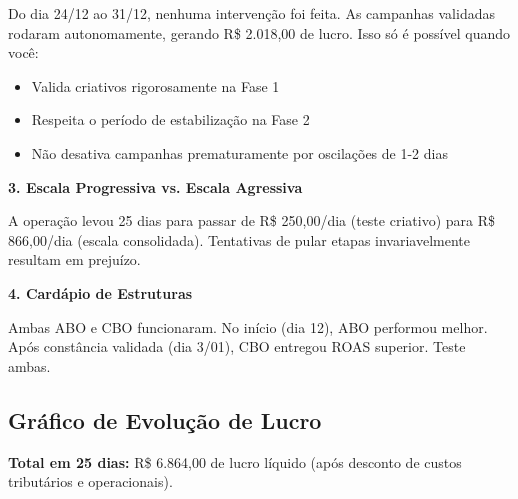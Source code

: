 \documentclass[12pt, a4paper]{article}
\newcommand{\reais}[1]{R\$ #1}
\begin{document}
Do dia 24/12 ao 31/12, nenhuma intervenção foi feita. As campanhas validadas rodaram autonomamente, gerando \reais{2.018,00} de lucro. Isso só é possível quando você:
\begin{itemize}
    \item Valida criativos rigorosamente na Fase 1
    \item Respeita o período de estabilização na Fase 2
    \item Não desativa campanhas prematuramente por oscilações de 1-2 dias
\end{itemize}

\pagebreak

\textbf{3. Escala Progressiva vs. Escala Agressiva}

A operação levou 25 dias para passar de \reais{250,00}/dia (teste criativo) para \reais{866,00}/dia (escala consolidada). Tentativas de pular etapas invariavelmente resultam em prejuízo.

\textbf{4. Cardápio de Estruturas}

Ambas ABO e CBO funcionaram. No início (dia 12), ABO performou melhor. Após constância validada (dia 3/01), CBO entregou ROAS superior. Teste ambas.

\subsection{Gráfico de Evolução de Lucro}

\begin{center}
\end{center}

\textbf{Total em 25 dias:} \reais{6.864,00} de lucro líquido (após desconto de custos tributários e operacionais).
\end{document}
